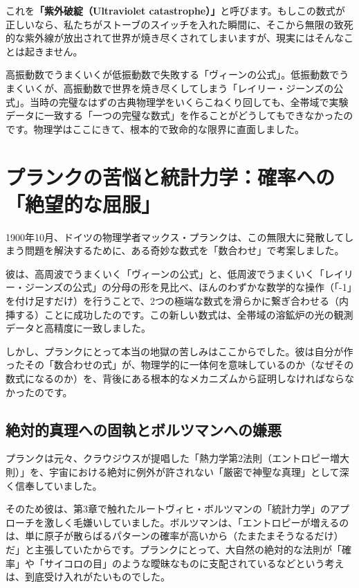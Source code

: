 これを\textbf{「紫外破綻（Ultraviolet catastrophe）」}と呼びます。もしこの数式が正しいなら、私たちがストーブのスイッチを入れた瞬間に、そこから無限の致死的な紫外線が放出されて世界が焼き尽くされてしまいますが、現実にはそんなことは起きません。

高振動数でうまくいくが低振動数で失敗する「ヴィーンの公式」。低振動数でうまくいくが、高振動数で世界を焼き尽くしてしまう「レイリー・ジーンズの公式」。当時の完璧なはずの古典物理学をいくらこねくり回しても、全帯域で実験データに一致する「一つの完璧な数式」を作ることがどうしてもできなかったのです。物理学はここにきて、根本的で致命的な限界に直面しました。

\section{プランクの苦悩と統計力学：確率への「絶望的な屈服」}

1900年10月、ドイツの物理学者マックス・プランクは、この無限大に発散してしまう問題を解決するために、ある奇妙な数式を「数合わせ」で考案しました。

彼は、高周波でうまくいく「ヴィーンの公式」と、低周波でうまくいく「レイリー・ジーンズの公式」の分母の形を見比べ、ほんのわずかな数学的な操作（「-1」を付け足すだけ）を行うことで、2つの極端な数式を滑らかに繋ぎ合わせる（内挿する）ことに成功したのです。この新しい数式は、全帯域の溶鉱炉の光の観測データと高精度に一致しました。

しかし、プランクにとって本当の地獄の苦しみはここからでした。彼は自分が作ったその「数合わせの式」が、物理学的に一体何を意味しているのか（なぜその数式になるのか）を、背後にある根本的なメカニズムから証明しなければならなかったのです。

\subsection{絶対的真理への固執とボルツマンへの嫌悪}

プランクは元々、クラウジウスが提唱した「熱力学第2法則（エントロピー増大則）」を、宇宙における絶対に例外が許されない「厳密で神聖な真理」として深く信奉していました。

そのため彼は、第3章で触れたルートヴィヒ・ボルツマンの「統計力学」のアプローチを激しく毛嫌いしていました。ボルツマンは、「エントロピーが増えるのは、単に原子が散らばるパターンの確率が高いから（たまたまそうなるだけ）だ」と主張していたからです。プランクにとって、大自然の絶対的な法則が「確率」や「サイコロの目」のような曖昧なものに支配されているなどという考えは、到底受け入れがたいものでした。

